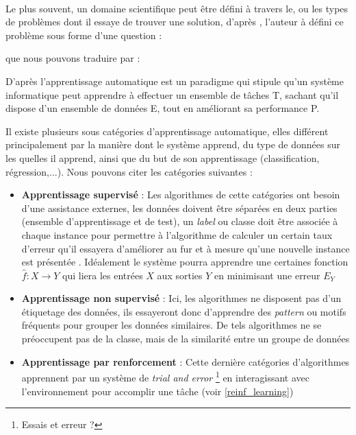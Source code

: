 		\paragraph{}
		Le plus souvent, un domaine scientifique peut être défini à travers le, ou les types de problèmes dont il essaye de trouver une solution, d'après \cite{mitchelllearning}, l'auteur à défini ce problème sous forme d'une question :
		\begin{quote}
			\cite{mitchelllearning}
		\end{quote}
		que nous pouvons traduire par :
		\begin{quote}
		\end{quote}
		\par 
		D'après \cite{mitchelllearning} l'apprentissage automatique est un paradigme qui stipule qu'un système informatique peut apprendre à effectuer un ensemble de tâches T, sachant qu'il dispose d'un ensemble de données E, tout en améliorant sa performance P.
		\par
		Il existe plusieurs sous catégories d'apprentissage automatique, elles différent principalement par la manière dont le système apprend, du type de données sur les quelles il apprend, ainsi que du but de son apprentissage (classification, régression,...). Nous pouvons citer les catégories suivantes :
		\begin{itemize}
			\item  \textbf{Apprentissage supervisé} : Les algorithmes de cette catégories ont besoin d'une assistance externes, les données doivent être séparées en deux parties (ensemble d'apprentissage et de test), un \textit{label} ou classe doit être associée à chaque instance pour permettre à l'algorithme de calculer un certain taux d'erreur qu'il essayera d'améliorer au fur et à mesure qu'une nouvelle instance est présentée \cite{supervised_learning}. Idéalement le système pourra apprendre une certaines fonction $\hat{f} : X \rightarrow Y$ qui liera les entrées $X$ aux sorties $Y$ en minimisant une erreur $E_Y$ 
			
			\item \textbf{Apprentissage non supervisé} : Ici, les algorithmes ne disposent pas d'un étiquetage des données, ils essayeront donc d'apprendre des \textit{pattern} ou motifs fréquents pour grouper les données similaires. De tels algorithmes ne se préoccupent pas de la classe, mais de la similarité entre un groupe de données \cite{unsupervised_learning}
			
			\item \textbf{Apprentissage par renforcement} : Cette dernière catégories d'algorithmes apprennent par un système de \textit{trial and error} \footnote{Essais et erreur ?} en interagissant avec l'environnement pour accomplir une tâche (voir \ref{reinf_learning})
		\end{itemize}
